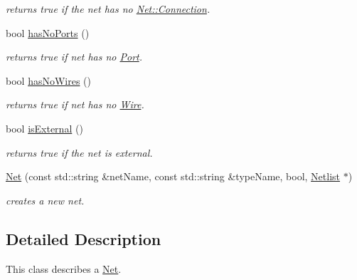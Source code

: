 \begin{DoxyCompactItemize}
\begin{DoxyCompactList}\small\item\em returns true if the net has no \hyperlink{class_open_chams_1_1_net_1_1_connection}{Net\+::\+Connection}. \end{DoxyCompactList}\item 
\mbox{\label{class_open_chams_1_1_net_a3eef7a6d1e945441f197f0918ab8895e}} 
bool \hyperlink{class_open_chams_1_1_net_a3eef7a6d1e945441f197f0918ab8895e}{has\+No\+Ports} ()
\begin{DoxyCompactList}\small\item\em returns true if net has no \hyperlink{class_open_chams_1_1_port}{Port}. \end{DoxyCompactList}\item 
\mbox{\label{class_open_chams_1_1_net_ac9470e72b26d4cddef3d13e69057ee54}} 
bool \hyperlink{class_open_chams_1_1_net_ac9470e72b26d4cddef3d13e69057ee54}{has\+No\+Wires} ()
\begin{DoxyCompactList}\small\item\em returns true if net has no \hyperlink{class_open_chams_1_1_wire}{Wire}. \end{DoxyCompactList}\item 
\mbox{\label{class_open_chams_1_1_net_ab2570574db49633f58f7b64099d6852c}} 
bool \hyperlink{class_open_chams_1_1_net_ab2570574db49633f58f7b64099d6852c}{is\+External} ()
\begin{DoxyCompactList}\small\item\em returns true if the net is external. \end{DoxyCompactList}\item 
\hyperlink{class_open_chams_1_1_net_a471976cf479ec4b1f521923d3a4e617d}{Net} (const std\+::string \&net\+Name, const std\+::string \&type\+Name, bool, \hyperlink{class_open_chams_1_1_netlist}{Netlist} $\ast$)
\begin{DoxyCompactList}\small\item\em creates a new net. \end{DoxyCompactList}\end{DoxyCompactItemize}


\subsection{Detailed Description}
This class describes a \hyperlink{class_open_chams_1_1_net}{Net}. 

